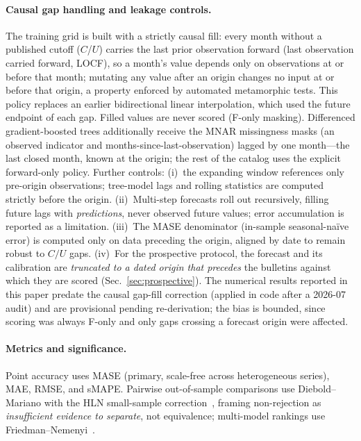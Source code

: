\documentclass[runningheads]{llncs}
\newcommand{\smape}{sMAPE}
\begin{document}
\paragraph{Causal gap handling and leakage controls.} The training grid is built
with a strictly causal fill: every month without a published cutoff ($C$/$U$)
carries the last prior observation forward (last observation carried forward,
LOCF), so a month's value depends only on observations at or before that month;
mutating any value after an origin changes no input at or before that origin, a
property enforced by automated metamorphic tests. This policy replaces an earlier
bidirectional linear interpolation, which used the future endpoint of each gap.
Filled values are never scored (F-only masking). Differenced gradient-boosted trees
additionally receive the MNAR missingness masks (an observed indicator and
months-since-last-observation) lagged by one month---the last closed month, known
at the origin; the rest of the catalog uses the explicit forward-only policy.
Further controls: (i)~the expanding window references only pre-origin
observations; tree-model lags and rolling statistics are computed strictly before
the origin. (ii)~Multi-step forecasts roll out recursively, filling future lags with
\emph{predictions}, never observed future values; error accumulation is reported as
a limitation. (iii)~The MASE denominator (in-sample seasonal-naïve error) is
computed only on data preceding the origin, aligned by date to remain robust to
$C/U$ gaps. (iv)~For the prospective protocol, the forecast and its calibration are
\emph{truncated to a dated origin that precedes} the bulletins against which they are
scored (Sec.~\ref{sec:prospective}). The numerical results reported in this paper
predate the causal gap-fill correction (applied in code after a 2026-07 audit) and
are provisional pending re-derivation; the bias is bounded, since scoring was always
F-only and only gaps crossing a forecast origin were affected.

\paragraph{Metrics and significance.} Point accuracy uses MASE (primary, scale-free
across heterogeneous series), MAE, RMSE, and \smape. Pairwise out-of-sample
comparisons use Diebold--Mariano with the HLN small-sample
correction~\cite{diebold1995,harvey1997}, framing non-rejection as
\emph{insufficient evidence to separate}, not equivalence; multi-model rankings use
Friedman--Nemenyi~\cite{demsar2006}.
\end{document}
